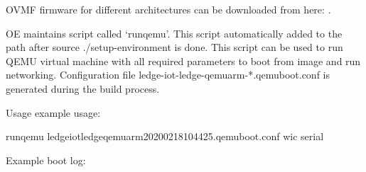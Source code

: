 \documentclass[a4paper,10pt,oneside,english]{sphinxmanual}
\begin{document}
OVMF firmware for different architectures can be downloaded from here:  .

OE maintains script called ‘runqemu’.  This script automatically added to the path after source ./setup-environment is done. This script can be used to run
QEMU virtual machine with all required parameters to boot from image and run networking. Configuration file ledge-iot-ledge-qemuarm-*.qemuboot.conf is
generated during the build process.

Usage example usage:

\begin{sphinxVerbatim}[commandchars=\\\{\}]
runqemu ledge\PYGZhy{}iot\PYGZhy{}ledge\PYGZhy{}qemuarm\PYGZhy{}20200218104425.qemuboot.conf wic serial
\end{sphinxVerbatim}

Example boot log:
\end{document}
